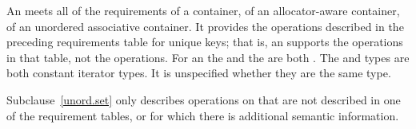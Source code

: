\pnum
An  meets all of the requirements
of a container,
of an allocator-aware container,
of an unordered associative container.
It provides the operations described in the preceding requirements table for unique keys;
that is, an  supports the  operations in that table,
not the  operations.
For an  the 
and the  are both .
The  and  types are both constant iterator types.
It is unspecified whether they are the same type.

\pnum
Subclause~\ref{unord.set} only describes operations on  that
are not described in one of the requirement tables, or for which there
is additional semantic information.

